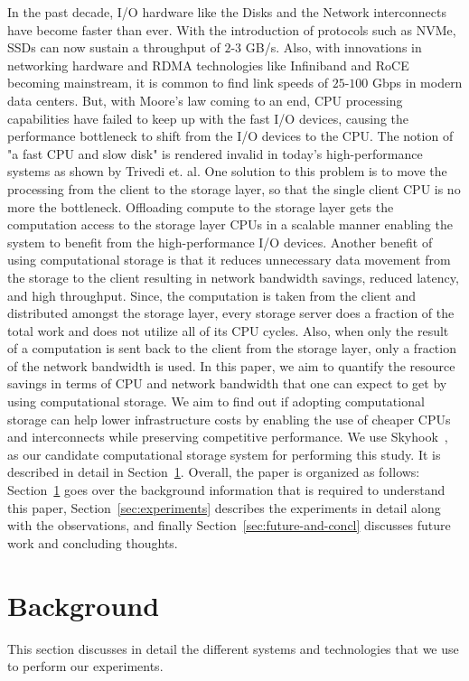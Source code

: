 \documentclass[12pt]{article}
\begin{document}
In the past decade, I/O hardware like the Disks and the Network interconnects have become faster than ever. With the introduction of protocols such as NVMe, SSDs can now sustain a throughput of $2$-$3$ GB/s. Also, with innovations in networking hardware and RDMA technologies like Infiniband and RoCE becoming mainstream, it is common to find link speeds of $25$-$100$ Gbps in modern data centers. But, with Moore's law coming to an end, CPU processing capabilities have failed to keep up with the fast I/O devices, causing the performance bottleneck to shift from the I/O devices to the CPU. The notion of "a fast CPU and slow disk" is rendered invalid in today's high-performance systems as shown by Trivedi et. al. One solution to this problem is to move the processing from the client to the storage layer, so that the single client CPU is no more the bottleneck. Offloading compute to the storage layer gets the computation access to the storage layer CPUs in a scalable manner enabling the system to benefit from the high-performance I/O devices. Another benefit of using computational storage is that it reduces unnecessary data movement from the storage to the client resulting in network bandwidth savings, reduced latency, and high throughput. Since, the computation is taken from the client and distributed amongst the storage layer, every storage server does a fraction of the total work and does not utilize all of its CPU cycles. Also, when only the result of a computation is sent back to the client from the storage layer, only a fraction of the network bandwidth is used. In this paper, we aim to quantify the resource savings in terms of CPU and network bandwidth that one can expect to get by using computational storage. We aim to find out if adopting computational storage can help lower infrastructure costs by enabling the use of cheaper CPUs and interconnects while preserving competitive performance. We use Skyhook~\cite{chakraborty2022skyhook}, as our candidate computational storage system for performing this study. It is described in detail in Section~\ref{sec:background}. Overall, the paper is organized as follows: Section~\ref{sec:background} goes over the background information that is required to understand this paper, Section~\ref{sec:experiments} describes the experiments in detail along with the observations, and finally Section~\ref{sec:future-and-concl} discusses future work and concluding thoughts.

\section{Background}
\label{sec:background}
This section discusses in detail the different systems and technologies that we use to perform our experiments.
\end{document}
